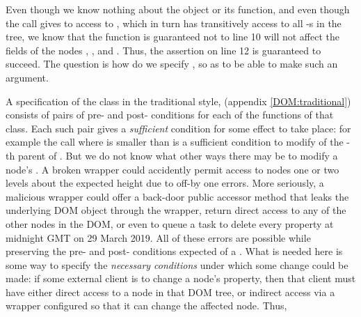Even though we know nothing about the  object or
its  function, and even though the call gives
to  access to , which in turn has transitively
access to all -s in the tree, we know that %
the  function is guaranteed not to line 10 will not
affect the  fields of the nodes , ,
and .  Thus, the assertion on line 12 is guaranteed to
succeed.  The question is how do we specify , so as to be
able to make such an argument. %

A specification of the class  in the traditional
style, \eg \cite{Leavens-etal07} (\cf appendix \ref{DOM:traditional})
consists of pairs of pre- and post- conditions for each of the
functions of that class. Each such pair gives a {\em sufficient}
condition for some effect to take place: for example the
call  where  is smaller
than  is a sufficient condition to modify 
of the -th parent of . But we do not know what
other ways there may be to modify a node's .  A broken
wrapper could accidently permit access to nodes one or two levels
about the expected height due to off-by one errors. More seriously,
a malicious wrapper could offer a
back-door public accessor method that leaks the underlying DOM
object through the wrapper, return direct access to any of the
other nodes in the DOM, or even to queue a task to
delete every property at midnight GMT on 29 March 2019. All of these errors are possible while
preserving the pre- and post- conditions expected of a . 
What is needed here is some way to specify the \emph{necessary
conditions}
under which some change could be made: if some external client is to
change a node's property, then  that client must have either direct
access to a node in that DOM tree, or indirect access via a wrapper
configured so that it can change the affected node.
Thus,
{}


